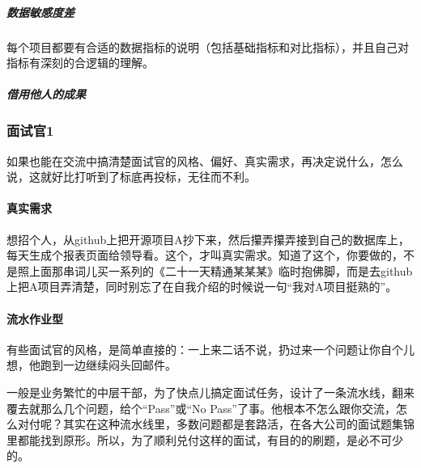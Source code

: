 \documentclass[letterpaper,11pt,english]{sphinxmanual}
\begin{document}
\subparagraph{数据敏感度差}
\label{\detokenize{chapter_interview/CV:id5}}
每个项目都要有合适的数据指标的说明（包括基础指标和对比指标），并且自己对指标有深刻的合逻辑的理解。


\subparagraph{借用他人的成果}
\label{\detokenize{chapter_interview/CV:id6}}

\subsubsection{面试官1\sphinxfootnotemark[286]}
\label{\detokenize{chapter_interview/interviewer:id1}}\label{\detokenize{chapter_interview/interviewer::doc}}%
\begin{footnotetext}[286]\sphinxAtStartFootnote
{}
%
\end{footnotetext}\ignorespaces 
如果也能在交流中搞清楚面试官的风格、偏好、真实需求，再决定说什么，怎么说，这就好比打听到了标底再投标，无往而不利。


\paragraph{真实需求}
\label{\detokenize{chapter_interview/interviewer:id2}}
想招个人，从github上把开源项目A抄下来，然后攥弄攥弄接到自己的数据库上，每天生成个报表页面给领导看。这个，才叫真实需求。知道了这个，你要做的，不是照上面那串词儿买一系列的《二十一天精通某某某》临时抱佛脚，而是去github上把A项目弄清楚，同时别忘了在自我介绍的时候说一句“我对A项目挺熟的”。


\paragraph{流水作业型}
\label{\detokenize{chapter_interview/interviewer:id3}}
有些面试官的风格，是简单直接的：一上来二话不说，扔过来一个问题让你自个儿想，他跑到一边继续闷头回邮件。

一般是业务繁忙的中层干部，为了快点儿搞定面试任务，设计了一条流水线，翻来覆去就那么几个问题，给个“Pass”或“No
Pass”了事。他根本不怎么跟你交流，怎么对付呢？其实在这种流水线里，多数问题都是套路活，在各大公司的面试题集锦里都能找到原形。所以，为了顺利兑付这样的面试，有目的的刷题，是必不可少的。
\end{document}

